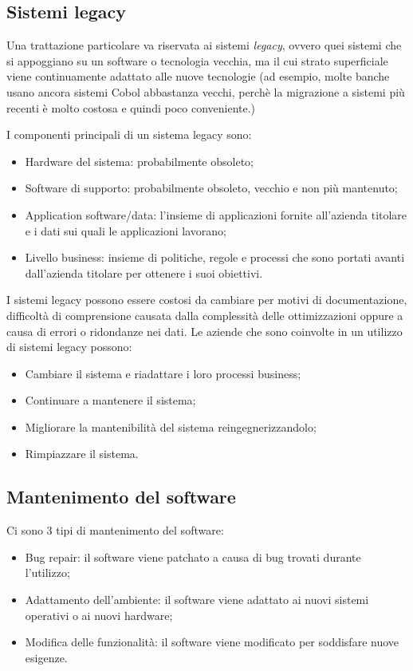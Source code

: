 \documentclass[a4paper, 10pt]{article}
\begin{document}
\subsection{Sistemi legacy}
Una trattazione particolare va riservata ai sistemi \textit{legacy}, ovvero quei sistemi che si appoggiano su un software o tecnologia vecchia, ma il cui strato superficiale viene continuamente adattato alle nuove tecnologie (ad esempio, molte banche usano ancora sistemi Cobol abbastanza vecchi, perchè la migrazione a sistemi più recenti è molto costosa e quindi poco conveniente.)

I componenti principali di un sistema legacy sono:
\begin{itemize}
	\item Hardware del sistema: probabilmente obsoleto;
	\item Software di supporto: probabilmente obsoleto, vecchio e non più mantenuto;
	\item Application software/data: l'insieme di applicazioni fornite all'azienda titolare e i dati sui quali le applicazioni lavorano;
	\item Livello business: insieme di politiche, regole e processi che sono portati avanti dall'azienda titolare per ottenere i suoi obiettivi.
\end{itemize}

I sistemi legacy possono essere costosi da cambiare per motivi di documentazione, difficoltà di comprensione causata dalla complessità delle ottimizzazioni oppure a causa di errori o ridondanze nei dati. Le aziende che sono coinvolte in un utilizzo di sistemi legacy possono:
\begin{itemize}
	\item Cambiare il sistema e riadattare i loro processi business;
	\item Continuare a mantenere il sistema;
	\item Migliorare la mantenibilità del sistema reingegnerizzandolo;
	\item Rimpiazzare il sistema.
\end{itemize}

\subsection{Mantenimento del software}
Ci sono 3 tipi di mantenimento del software:
\begin{itemize}
	\item Bug repair: il software viene patchato a causa di bug trovati durante l'utilizzo;
	\item Adattamento dell'ambiente: il software viene adattato ai nuovi sistemi operativi o ai nuovi hardware;
	\item Modifica delle funzionalità: il software viene modificato per soddisfare nuove esigenze.
\end{itemize}
	
	
	
	
	
\end{document}
